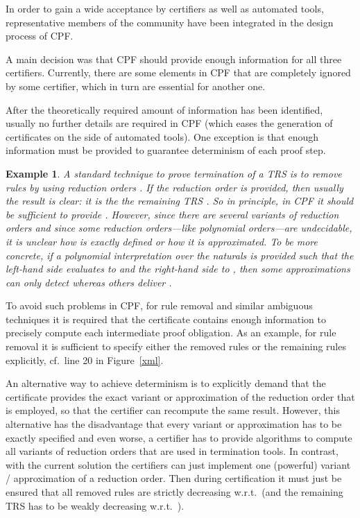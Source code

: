 \documentclass[USenglish]{eptcs}
\newcommand{\rFI}[1]{Figure~\ref{#1}}
\newtheorem{example}{Example}
\begin{document}
In order to gain a wide acceptance by  certifiers as well as automated tools,
representative members of the community have been integrated in the design
process of CPF. 

A main decision was that CPF should provide enough information for all three
certifiers. Currently, there are some elements in CPF that are completely
ignored by some certifier, which in turn are essential for another one. 

After the theoretically required amount of information has been identified,
usually no further details are required in CPF (which eases the generation of
certificates on the side of automated tools).  One exception is that enough
information must be provided to guarantee determinism of each proof step.

\begin{example}
A standard technique to prove termination of a TRS  is to 
remove rules by using reduction orders \cite{L79,HM07}.
If the reduction order  is provided, 
then usually the result is clear: it is the the remaining TRS . 
So in principle, in CPF it should be sufficient to provide . However,
since there are several variants of reduction orders and since some reduction
orders---like polynomial orders---are undecidable, it is unclear how  is exactly
defined or how it is approximated. To be more concrete, if a polynomial interpretation
over the naturals is provided such that the left-hand side  evaluates 
to  and the 
right-hand side  to , then some approximations can only detect
 whereas others deliver .
\end{example}

To avoid such problems in CPF, for rule removal and similar ambiguous techniques it is required that the certificate contains enough information to precisely compute each intermediate
proof obligation. As an example, for rule removal it is sufficient to specify either the
removed rules or the remaining rules explicitly, cf.\ line 20 in \rFI{xml}.

An alternative way to achieve determinism is to explicitly demand that the
certificate provides the exact variant or approximation of the reduction order
that is employed, so that the certifier can recompute the same result.
However, this
alternative has the disadvantage that every variant or approximation has to
be exactly specified and even worse, a certifier has to provide algorithms
to compute all variants of reduction orders that are used in termination tools. 
In contrast, with the current solution the certifiers can just implement one
(powerful) variant / approximation of a reduction order. Then during certification
it must just be ensured that all removed rules are strictly decreasing w.r.t.\  (and
the remaining TRS has to be weakly decreasing w.r.t.\ ). 
\end{document}
